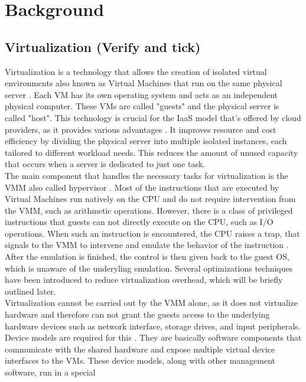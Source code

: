 \chapter{Background}\label{chapter:background}
\section{Virtualization (Verify and tick)}
Virtualization is a technology that allows the creation of isolated virtual environments also known as 
Virtual Machines that run on the same physical server \cite{virtualization_review}. Each VM has its own 
operating system and acts as an independent physical computer. These VMs are called "guests" and the 
physical server is called "host". This technology is crucial for the \ac{IaaS} model that's offered by 
cloud providers, as it provides various advantages \cite{virtualization_review}. It improves resource and 
cost efficiency by dividing the physical server into multiple isolated instances, each tailored to 
different workload needs. This reduces the amount of unused capacity that occurs when a server is dedicated 
to just one task. \\
The main component that handles the necessary tasks for virtualization is the \ac{VMM} 
also called hypervisor \cite{nitro_whitepaper}. Most of the instructions that are executed by Virtual 
Machines run natively on the CPU and do not require intervention from the \acs{VMM}, such as arithmetic 
operations. 
However, there is a class of privileged instructions that guests can not directly execute on the CPU, 
such as I/O operations. When such an instruction is encountered, the CPU raises a 
trap, that signals to the \acs{VMM} to intervene and emulate the behavior of the instruction \cite{nitro_whitepaper}.  
After the emulation is finished, the control is then given back to the guest OS, 
which is unaware of the underyling emulation. Several optimizations techniques have been introduced 
to reduce virtualization overhead, which will be briefly outlined later. \\
Virtualization cannot be carried out by the VMM alone, as it does not virtualize hardware and therefore 
can not grant the guests access to the underlying hardware devices such as network interface, storage drives, 
and input peripherals. Device models are required for this \cite{nitro_whitepaper}. They are basically 
software components that communicate with the shared hardware and expose multiple virtual device 
interfaces to the VMs. These device models, along with other management software, run in a special 
